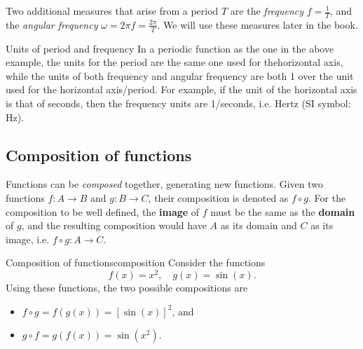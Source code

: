 Two additional measures that arise from a period $T$ are the \emph{frequency} $f=\frac{1}{T}$, and the \emph{angular frequency} $\omega=2\pi f=\frac{2\pi}{T}$. We will use these measures later in the book.

\begin{note}{Units of period and frequency}{}
	In a periodic function as the one in the above example, the units for the period are the same one used for thehorizontal axis, while the units of both frequency and angular frequency are both 1 over the unit used for the horizontal axis/period. For example, if the unit of the horizontal axis is that of seconds, then the frequency units are 1/seconds, i.e. Hertz (SI symbol: \si{Hz}).
\end{note}

\subsection{Composition of functions}
Functions can be \emph{composed} together, generating new functions. Given two functions $f:A\to B$ and $g:B\to C$, their composition is denoted as $f\circ g$. For the composition to be well defined, the \textbf{image} of $f$ must be the same as the \textbf{domain} of $g$, and the resulting composition would have $A$ as its domain and $C$ as its image, i.e. $f\circ g:A\to C$.

\begin{example}{Composition of functions}{composition}
	Consider the functions
	\[
		f(x)=x^{2},\quad g(x)=\sin(x).
	\]
	Using these functions, the two possible compositions are
	\begin{itemize}
		\item $f\circ g = f\left( g(x) \right) = \left[ \sin(x) \right]^{2}$, and
		\item $g\circ f = g\left( f(x) \right) = \sin\left( x^{2} \right)$.
	\end{itemize}
\end{example}

